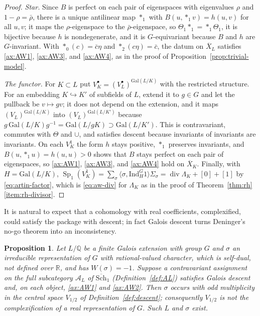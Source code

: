 \documentclass[11pt]{amsart}
\theoremstyle{plain}
\newtheorem{proposition}[theorem]{Proposition}
\theoremstyle{definition}
\theoremstyle{remark}
\numberwithin{equation}{section}
\newcommand{\R}{\mathbb{R}}
\newcommand{\Q}{\mathbb{Q}}
\newcommand{\Xbar}{\overline{X}}
\newcommand{\cA}{\mathcal{A}}
\newcommand{\Schbar}{\overline{\mathrm{Sch}}}
\DeclareMathOperator{\divisor}{div}
\begin{document}
\begin{proof}
\emph{Star.} Since $B$ is perfect on each pair of eigenspaces with
eigenvalues $\rho$ and $1-\rho=\bar\rho$, there is a unique antilinear
map $*_1$ with $B(u,*_1v)=h(u,v)$ for all $u,v$; it maps the
$\rho$-eigenspace to the $\bar\rho$-eigenspace, so
$\Theta_1*_1=*_1\Theta_1$, it is bijective because $h$ is
nondegenerate, and it is $G$-equivariant because $B$ and $h$ are
$G$-invariant. With $*_0(c)=\bar c\eta$ and $*_2(c\eta)=\bar c$, the
datum on $\Xbar_L$ satisfies \ref{ax:AW1}, \ref{ax:AW3}, and
\ref{ax:AW4}, as in the proof of
Proposition~\ref{prop:trivial-model}.

\emph{The functor.} For $K\subset L$ put
$V^\bullet_K=(V^\bullet_L)^{\mathrm{Gal}(L/K)}$ with the restricted
structure. For an embedding $K\hookrightarrow K'$ of subfields of $L$,
extend it to $g\in G$ and let the pullback be $v\mapsto gv$; it does
not depend on the extension, and it maps
$(V_L)^{\mathrm{Gal}(L/K)}$ into $(V_L)^{\mathrm{Gal}(L/K')}$ because
$g\,\mathrm{Gal}(L/K)g^{-1}=\mathrm{Gal}(L/gK)\supset
\mathrm{Gal}(L/K')$. This is contravariant, commutes with $\Theta$ and
$\cup$, and satisfies descent because invariants of invariants are
invariants. On each $V^1_K$ the form $h$ stays positive, $*_1$ preserves
invariants, and $B(u,*_1u)=h(u,u)>0$ shows that $B$ stays perfect on
each pair of eigenspaces, so \ref{ax:AW1}, \ref{ax:AW3}, and
\ref{ax:AW4} hold on $\Xbar_K$. Finally, with $H=\mathrm{Gal}(L/K)$,
$\operatorname{Sp}_1(V^1_K)=\sum_\sigma\langle\sigma,
\mathrm{Ind}_H^G1\rangle\Sigma_\sigma=\divisor\Lambda_K+[0]+[1]$ by
\eqref{eq:artin-factor}, which is \eqref{eq:aw-div} for $\Lambda_K$ as
in the proof of Theorem~\ref{thm:rh}\ref{item:rh-divisor}.
\end{proof}

It is natural to expect that a cohomology with real coefficients,
complexified, could satisfy the package with descent; in fact Galois
descent turns Deninger's no-go theorem into an inconsistency.

\begin{proposition}\label{prop:real-coeff}
Let $L/\Q$ be a finite Galois extension with group $G$ and $\sigma$ an
irreducible representation of $G$ with rational-valued character, which
is self-dual, not defined over $\R$, and has $W(\sigma)=-1$. Suppose a
contravariant assignment on the full subcategory $\cA_L$ of $\Schbar_1$
(Definition~\ref{def:AL}) satisfies Galois descent and, on each object,
\ref{ax:AW1} and
\ref{ax:AW2}. Then $\sigma$ occurs with odd multiplicity in the central space
$V_{1/2}$ of Definition~\ref{def:descent}; consequently
$V_{1/2}$ is not the complexification of a real representation of $G$.
Such $L$ and $\sigma$ exist.
\end{proposition}
\end{document}
